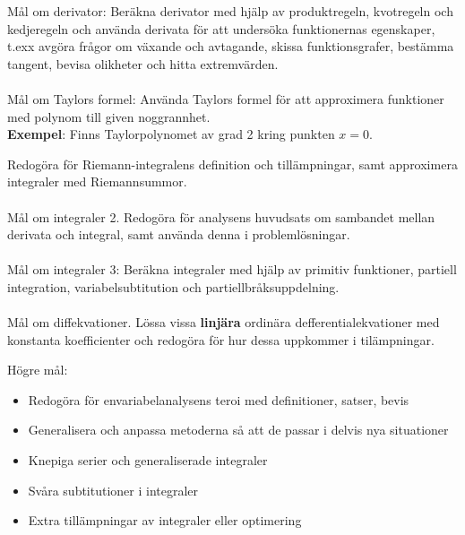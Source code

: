 \documentclass{report}
\begin{document}
\noindent
Mål om derivator: Beräkna derivator med hjälp av produktregeln, kvotregeln och kedjeregeln och använda derivata för att undersöka funktionernas egenskaper, t.exx avgöra frågor om växande och avtagande, skissa funktionsgrafer, bestämma tangent, bevisa olikheter och hitta extremvärden.\\\\
\noindent
Mål om Taylors formel: Använda Taylors formel för att approximera funktioner med polynom till given noggrannhet.\\ 
\textbf{Exempel}: Finns Taylorpolynomet av grad 2 kring punkten $ x = 0 $.

\noindent
Redogöra för Riemann-integralens definition och tillämpningar, samt approximera integraler med Riemannsummor.\\\\

\noindent
Mål om integraler 2. Redogöra för analysens huvudsats om sambandet mellan derivata och integral, samt använda denna i problemlösningar. \\\\

\noindent
Mål om integraler 3: Beräkna integraler med hjälp av primitiv funktioner, partiell integration, variabelsubtitution och partiellbråksuppdelning. \\\\

\noindent
Mål om diffekvationer. Lössa vissa \textbf{linjära} ordinära defferentialekvationer med konstanta koefficienter och redogöra för hur dessa uppkommer i tilämpningar. 

\noindent
Högre mål:
\begin{itemize}
	\item Redogöra för envariabelanalysens teroi med definitioner, satser, bevis
	\item Generalisera och anpassa metoderna så att de passar i delvis nya situationer
	\item Knepiga serier och generaliserade integraler
	\item Svåra subtitutioner i integraler
	\item Extra tillämpningar av integraler eller optimering
\end{itemize}

\pagebreak
\end{document}
